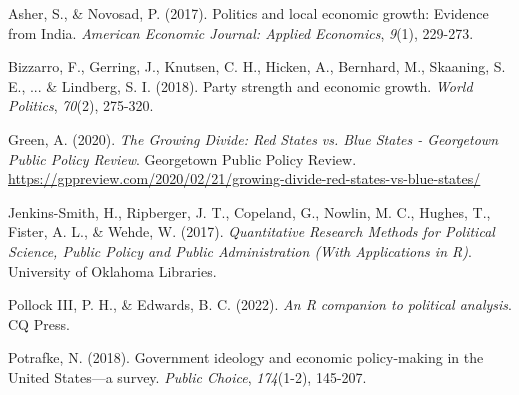 \documentclass[11pt]{article}
\begin{document}
\begin{references}
\item Asher, S., \& Novosad, P. (2017). Politics and local economic growth: Evidence from India. \textit{American Economic Journal: Applied Economics}, \textit{9}(1), 229-273.
\item Bizzarro, F., Gerring, J., Knutsen, C. H., Hicken, A., Bernhard, M., Skaaning, S. E., ... \& Lindberg, S. I. (2018). Party strength and economic growth. \textit{World Politics}, \textit{70}(2), 275-320.
\item Green, A. (2020). \textit{The Growing Divide: Red States vs. Blue States - Georgetown Public Policy Review}. Georgetown Public Policy Review. \url{https://gppreview.com/2020/02/21/growing-divide-red-states-vs-blue-states/}
\item Jenkins-Smith, H., Ripberger, J. T., Copeland, G., Nowlin, M. C., Hughes, T., Fister, A. L., \& Wehde, W. (2017). \textit{Quantitative Research Methods for Political Science, Public Policy and Public Administration (With Applications in R)}. University of Oklahoma Libraries.
\item Pollock III, P. H., \& Edwards, B. C. (2022). \textit{An R companion to political analysis}. CQ Press.
\item Potrafke, N. (2018). Government ideology and economic policy-making in the United States—a survey. \textit{Public Choice}, \textit{174}(1-2), 145-207.
\end{references}
\end{document}
